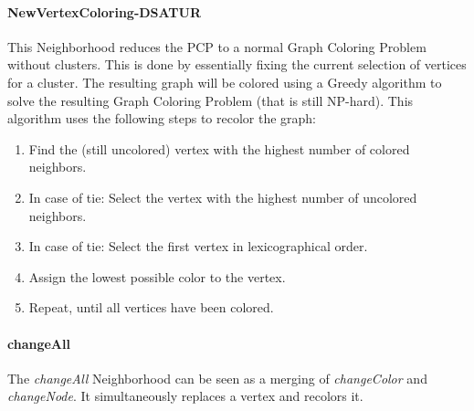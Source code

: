 \documentclass[paper=a4,fontsize=12pt]{scrartcl}
\begin{document}

\paragraph{NewVertexColoring-DSATUR}
This Neighborhood reduces the PCP to a normal Graph Coloring Problem without clusters. This is done by essentially fixing the current selection of vertices for a cluster. The resulting graph will be colored using a Greedy algorithm to solve the resulting Graph Coloring Problem (that is still NP-hard). This algorithm uses the following steps to recolor the graph:


\begin{enumerate}
	 \item Find the (still uncolored) vertex with the highest number of colored neighbors.
	 \item In case of tie: Select the vertex with the highest number of uncolored neighbors.
	 \item In case of tie: Select the first vertex in lexicographical order.
	 \item Assign the lowest possible color to the vertex.
	 \item Repeat, until all vertices have been colored.
\end{enumerate}

\paragraph{changeAll}
The \emph{changeAll} Neighborhood can be seen as a merging of \emph{changeColor} and \emph{changeNode}. It simultaneously replaces a vertex and recolors it. 
\end{document}
